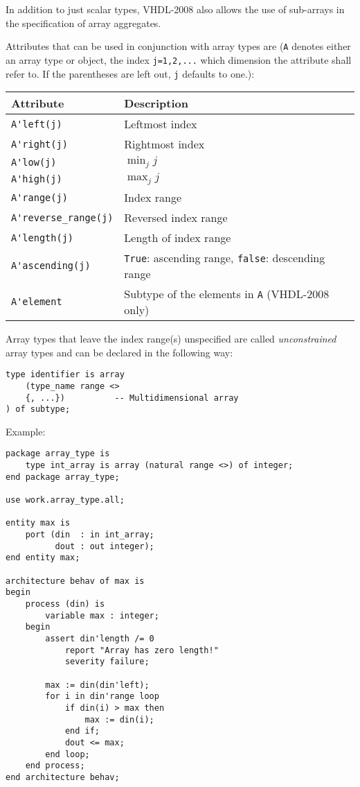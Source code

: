 \documentclass[fontsize=11pt,a4paper]{scrartcl}
\begin{document}
In addition to just scalar types, VHDL-2008 also allows the use of sub-arrays in the specification of array aggregates.

Attributes that can be used in conjunction with array types are (\lstinline!A! denotes either an array type or object, the index \lstinline!j=1,2,...! which dimension the attribute shall refer to. If the parentheses are left out, \lstinline!j! defaults to one.):

\begin{tabular}{ll}
\toprule
	\textbf{Attribute} & \textbf{Description}\\
\midrule
	\lstinline!A'left(j)! & Leftmost index\\
	\lstinline!A'right(j)! & Rightmost index\\
	\lstinline!A'low(j)! & $\min_j j$\\
	\lstinline!A'high(j)! & $\max_j j$\\
	\lstinline!A'range(j)! & Index range\\
	\lstinline!A'reverse_range(j)! & Reversed index range\\
	\lstinline!A'length(j)! & Length of index range\\
	\lstinline!A'ascending(j)! & \lstinline!True!: ascending range, \lstinline!false!: descending range\\
	\lstinline!A'element! & Subtype of the elements in \lstinline!A! (VHDL-2008 only)\\
\bottomrule
\end{tabular}

Array types that leave the index range(s) unspecified are called \emph{unconstrained} array types and can be declared in the following way:
\begin{lstlisting}
type identifier is array
	(type_name range <>
	{, ...})          -- Multidimensional array
) of subtype;
\end{lstlisting}

Example:
\begin{lstlisting}
package array_type is
	type int_array is array (natural range <>) of integer;
end package array_type;

use work.array_type.all;

entity max is
	port (din  : in int_array;
	      dout : out integer);
end entity max;

architecture behav of max is
begin
	process (din) is
		variable max : integer;
	begin
		assert din'length /= 0
			report "Array has zero length!"
			severity failure;

		max := din(din'left);
		for i in din'range loop
			if din(i) > max then
				max := din(i);
			end if;
			dout <= max;
		end loop;
	end process;
end architecture behav;
\end{lstlisting}
\end{document}
